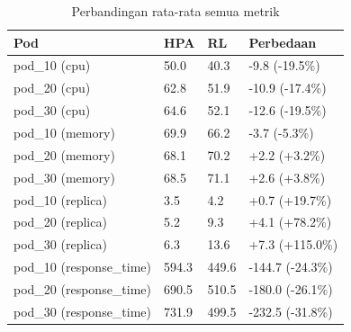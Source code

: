 \begin{table}[ht]
  \centering
  \caption{Perbandingan rata-rata semua metrik}\label{tab:deskriptif-all-metrics}
  \begin{tabular}{llll}
    \toprule
    Pod & HPA & RL & Perbedaan \\
    \midrule
    pod\_10 (cpu) & 50.0 & 40.3 & -9.8 (-19.5\%) \\
    pod\_20 (cpu) & 62.8 & 51.9 & -10.9 (-17.4\%) \\
    pod\_30 (cpu) & 64.6 & 52.1 & -12.6 (-19.5\%) \\
    pod\_10 (memory) & 69.9 & 66.2 & -3.7 (-5.3\%) \\
    pod\_20 (memory) & 68.1 & 70.2 & +2.2 (+3.2\%) \\
    pod\_30 (memory) & 68.5 & 71.1 & +2.6 (+3.8\%) \\
    pod\_10 (replica) & 3.5 & 4.2 & +0.7 (+19.7\%) \\
    pod\_20 (replica) & 5.2 & 9.3 & +4.1 (+78.2\%) \\
    pod\_30 (replica) & 6.3 & 13.6 & +7.3 (+115.0\%) \\
    pod\_10 (response\_time) & 594.3 & 449.6 & -144.7 (-24.3\%) \\
    pod\_20 (response\_time) & 690.5 & 510.5 & -180.0 (-26.1\%) \\
    pod\_30 (response\_time) & 731.9 & 499.5 & -232.5 (-31.8\%) \\
    \bottomrule
  \end{tabular}
\end{table}